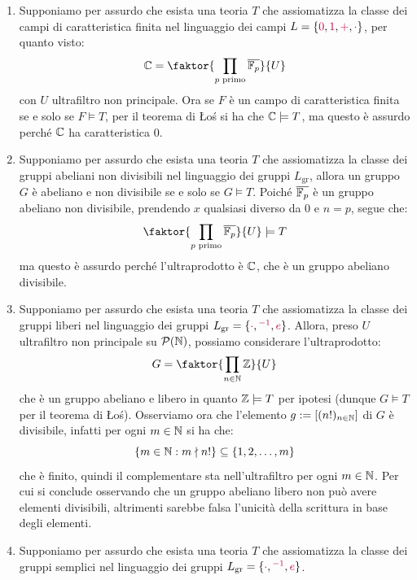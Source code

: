 \begin{soln}
\begin{enumerate}
        D'altra parte, in $M$ valgono tutte le formule $\neg\,\mathsf{Path}_n(a,b)$, quindi tra $a_M$ e $b_M$ non esiste alcun cammino finito. Contraddizione, perché in un grafo connesso ogni coppia di vertici è collegata da un cammino finito $\lightning$.
        \item Supponiamo per assurdo che esista una teoria $T$ che assiomatizza la classe dei campi di caratteristica finita nel linguaggio dei campi $L = \{\textcolor{purple}{0}, \textcolor{purple}{1}, \textcolor{purple}{+}, \textcolor{purple}{\cdot}\}$, per quanto visto:
        \[ \CC = \faktor{\prod_{p \text{ primo}} \overline{\mathbb{F}_p}}{U}
        \]
        con $U$ ultrafiltro non principale. Ora se $F$ è un campo di caratteristica finita se e solo se $F \models T$, per il teorema di Łoś si ha che $\mathbb C \models T$, ma questo è assurdo perché $\mathbb C$ ha caratteristica 0.
        \item Supponiamo per assurdo che esista una teoria $T$ che assiomatizza la classe dei gruppi abeliani non divisibili nel linguaggio dei gruppi $L_\text{gr}$, allora un gruppo $G$ è abeliano e non divisibile se e solo se $G \models T$.
        Poiché $\overline{\mathbb F_p}$ è un gruppo abeliano non divisibile, prendendo $x$ qualsiasi diverso da 0 e $n = p$, segue che:
        \[ \faktor{\prod_{p \text{ primo}} \overline{\mathbb{F}_p}}{U} \models T
        \]
        ma questo è assurdo perché l'ultraprodotto è $\mathbb C$, che è un gruppo abeliano divisibile.
        \item Supponiamo per assurdo che esista una teoria $T$ che assiomatizza la classe dei gruppi liberi nel linguaggio dei gruppi $L_\text{gr} = \{\textcolor{purple}{\cdot}, \textcolor{purple}{^{-1}}, \textcolor{purple}{e}\}$.
        Allora, preso $U$ ultrafiltro non principale su $\mathcal{P}(\mathbb N)$, possiamo considerare l'ultraprodotto:
        \[ G = \faktor{\prod_{n \in \NN} \ZZ}{U}
        \]
        che è un gruppo abeliano e libero in quanto $\mathbb Z \models T$ per ipotesi (dunque $G \models T$ per il teorema di Łoś).
        Osserviamo ora che l'elemento $g := [(n!)_{n \in \mathbb N}]$ di $G$ è divisibile, infatti per ogni $m \in \mathbb N$ si ha che:
        \[ \{m \in \mathbb N : m \nmid n!\} \subseteq \{1,2,\ldots,m\} \]
        che è finito, quindi il complementare sta nell'ultrafiltro per ogni $m \in \mathbb N$. Per cui si conclude osservando che un gruppo abeliano libero non può avere
        elementi divisibili, altrimenti sarebbe falsa l'unicità della scrittura in base degli elementi.
        \item Supponiamo per assurdo che esista una teoria $T$ che assiomatizza la classe dei gruppi semplici nel linguaggio dei gruppi $L_\text{gr} = \{\textcolor{purple}{\cdot}, \textcolor{purple}{^{-1}}, \textcolor{purple}{e}\}$.

\end{enumerate}
\end{soln}
